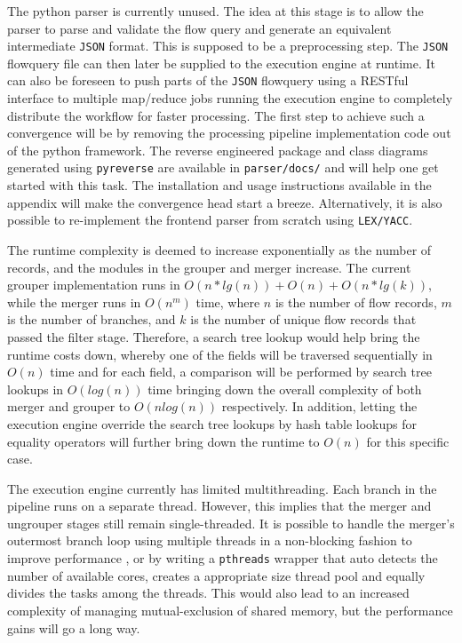 The python parser is currently unused. The idea at this stage is to allow the
parser to parse and validate the flow query and generate an equivalent
intermediate \texttt{JSON} format. This is supposed to be a preprocessing
step. The \texttt{JSON} flowquery file can then later be supplied to the
execution engine at runtime.  It can also be foreseen to push parts of the
\texttt{JSON} flowquery using a RESTful interface to  multiple map/reduce jobs running the execution engine to completely
distribute the workflow for faster processing. The first step to achieve such
a convergence will be by removing the processing pipeline implementation code
out of the python framework. The reverse engineered package and class diagrams
generated using \texttt{pyreverse} are available in \texttt{parser/docs/} and
will help one get started with this task. The installation and usage
instructions available in the appendix will make the convergence head start a
breeze. Alternatively, it is also possible to re-implement the frontend parser
from scratch using \texttt{LEX/YACC}.




The runtime complexity is deemed to increase exponentially as the number of
records, and the modules in the grouper and merger increase.  The current
grouper implementation runs in $O(n*lg(n)) + O(n) + O(n*lg(k))$, while the
merger runs in $O(n^m)$ time, where $n$ is the number of flow records, $m$ is
the number of branches, and $k$ is the number of unique flow records that
passed the filter stage. Therefore, a search tree lookup would help bring the
runtime costs down, whereby  one
of the fields will be traversed sequentially in $O(n)$ time and for each
field, a comparison will be performed by search tree lookups in $O(log(n))$
time bringing down the overall complexity of both merger and grouper to
$O(nlog(n))$ respectively. In addition, letting the execution engine override
the search tree lookups by hash table lookups for equality operators will
further bring down the runtime to $O(n)$ for this specific case.





The execution engine currently has limited multithreading. Each branch in the
pipeline runs on a separate thread. However, this implies that the merger and
ungrouper stages still remain single-threaded. It is possible to handle the
merger's outermost branch loop using multiple threads in a non-blocking
fashion to improve performance , or by
writing a \texttt{pthreads} wrapper that auto detects the number of available
cores, creates a appropriate size thread pool and equally divides the tasks
among the threads. This would also lead to an increased complexity of managing
mutual-exclusion of shared memory, but the performance gains will go a long
way.





